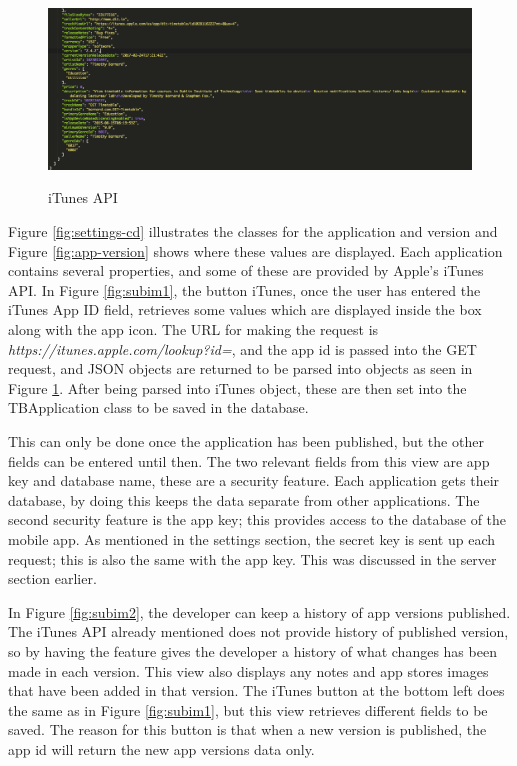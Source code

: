 \begin{figure}[!h]
    \caption{iTunes API}
    \centering
    \includegraphics[width=150mm]{images/itunes-api}
    \label{fig:itunes-API}
\end{figure} 

Figure \ref{fig:settings-cd} illustrates the classes for the application and version and Figure \ref{fig:app-version} shows where these values are displayed. Each application contains several properties, and some of these are provided by Apple’s iTunes API. In Figure \ref{fig:subim1}, the button iTunes, once the user has entered the iTunes App ID field, retrieves some values which are displayed inside the box along with the app icon. The URL for making the request is \textit{https://itunes.apple.com/lookup?id=}, and the app id is passed into the GET request, and JSON objects are returned to be parsed into objects as seen in Figure \ref{fig:itunes-API}. After being parsed into iTunes object, these are then set into the TBApplication class to be saved in the database.

This can only be done once the application has been published, but the other fields can be entered until then. The two relevant fields from this view are app key and database name, these are a security feature. Each application gets their database, by doing this keeps the data separate from other applications. The second security feature is the app key; this provides access to the database of the mobile app. As mentioned in the settings section, the secret key is sent up each request; this is also the same with the app key. This was discussed in the server section earlier.

In Figure \ref{fig:subim2}, the developer can keep a history of app versions published. The iTunes API already mentioned does not provide history of published version, so by having the feature gives the developer a history of what changes has been made in each version. This view also displays any notes and app stores images that have been added in that version. The iTunes button at the bottom left does the same as in Figure \ref{fig:subim1}, but this view retrieves different fields to be saved. The reason for this button is that when a new version is published, the app id will return the new app versions data only.

